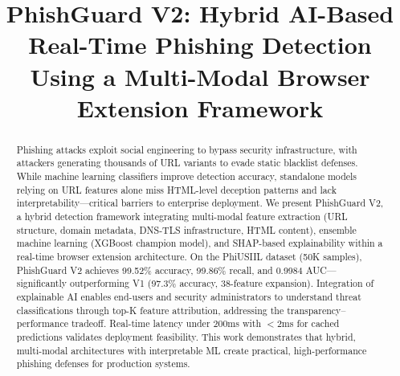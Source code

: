 \documentclass[conference]{IEEEtran}
\begin{document}
\title{PhishGuard V2: Hybrid AI-Based Real-Time Phishing Detection Using a Multi-Modal Browser Extension Framework}


\author{
\and
{}
\and
{}
}

\maketitle


\begin{abstract}
Phishing attacks exploit social engineering to bypass security infrastructure, with attackers generating thousands of URL variants to evade static blacklist defenses. While machine learning classifiers improve detection accuracy, standalone models relying on URL features alone miss HTML-level deception patterns and lack interpretability—critical barriers to enterprise deployment. We present PhishGuard V2, a hybrid detection framework integrating multi-modal feature extraction (URL structure, domain metadata, DNS-TLS infrastructure, HTML content), ensemble machine learning (XGBoost champion model), and SHAP-based explainability within a real-time browser extension architecture. On the PhiUSIIL dataset (50K samples), PhishGuard V2 achieves 99.52\% accuracy, 99.86\% recall, and 0.9984 AUC—significantly outperforming V1 (97.3\% accuracy, 38-feature expansion). Integration of explainable AI enables end-users and security administrators to understand threat classifications through top-K feature attribution, addressing the transparency–performance tradeoff. Real-time latency under 200ms with $<$2ms for cached predictions validates deployment feasibility. This work demonstrates that hybrid, multi-modal architectures with interpretable ML create practical, high-performance phishing defenses for production systems.
\end{abstract}
\end{document}
